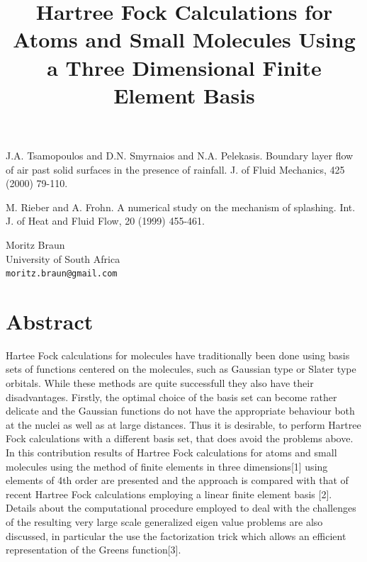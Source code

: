 \documentclass[article,A4,11pt]{llncs}%
\begin{document}

\begin{thebibliography}{10}
{\sc J.A. Tsamopoulos and D.N. Smyrnaios and N.A. Pelekasis}. {Boundary layer flow of air past solid surfaces in the presence of rainfall}. J. of Fluid Mechanics, 425 (2000) 79-110.

{\sc M. Rieber and A. Frohn}. {A numerical study on the mechanism of splashing}. Int. J. of Heat and Fluid Flow, 20 (1999) 455-461.
\end{thebibliography}

\title{Hartree Fock Calculations for Atoms and Small Molecules Using  a Three Dimensional  Finite Element Basis}
 \author{} \institute{}
\maketitle
\begin{center}
{\large Moritz Braun}\\
University of South Africa\\
{\tt moritz.braun@gmail.com}
\end{center}

\section*{Abstract}
Hartee Fock calculations for molecules have traditionally been done using basis sets 
of functions centered on  the molecules, such as Gaussian type or Slater type orbitals. While these methods are quite successfull they  also have their disadvantages. Firstly, the optimal choice of the basis set can become rather delicate and the Gaussian functions do not have the appropriate behaviour both at the nuclei as  well as at large distances.
Thus it is desirable, to perform Hartree Fock calculations with a different basis set, that does avoid the problems above.\\
In this contribution results of Hartree Fock calculations  for atoms and small molecules using the method of finite elements in three dimensions[1] using elements of 4th order are presented and the approach is  compared with that  of recent Hartree Fock calculations employing a linear finite element basis [2].  Details about the computational procedure employed to deal with the challenges of the resulting very large scale generalized eigen value problems are also discussed, in particular the use the factorization trick which allows an efficient representation of the Greens function[3].
\end{document}
